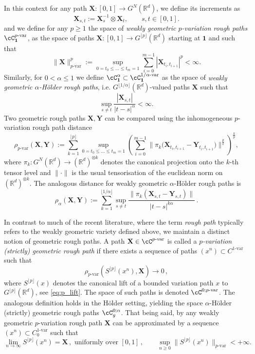\documentclass[12pt,a4paper]{article}
\numberwithin{equation}{section}
\def\bR{\mathbb{R}}\def\bS{\mathbb{S}}
\def\fX{\mathbf{X}}
\def\fY{\mathbf{Y}}\newcommand{\norm}[1]{\left\lVert#1\right\rVert}
\theoremstyle{plain}
\theoremstyle{definition}
\theoremstyle{remark}
\begin{document}
In this context for any path $\fX \colon [0,1] \to G^N(\bR^d)$, we define its increments as
\[
\fX_{s,t} := \fX_s^{-1} \otimes \fX_t, \qquad s,t \in [0,1].
\]
 and we define for any $p\geq1$ the space of \emph{weakly geometric $p$-variation rough paths} $\cC^{p\text{-var}}_{\mathbf{1}}$, as the space  of paths $\fX \colon [0,1] \to G^{\lfloor p \rfloor}(\bR^d)$ starting at ${\mathbf{1}}$ and such that
\[
\| \fX \|_{p\text{-var}}^p :=
    \sup_{0 = t_0 \leq \ldots \leq t_m = 1}
    \sum_{i=0}^{m-1} |\fX_{t_i,t_{i+1}}|^p < \infty.
\]
Similarly, for $0<\alpha \leq1$ we define $\cC^{\alpha}_{\mathbf{1}} \subset \cC^{1/\alpha\text{-var}}_{\mathbf{1}}$ as the space of \emph{weakly geometric $\alpha$-H\"older rough paths}, i.e. $G^{\lfloor 1/ \alpha\rfloor}(\bR^d)$-valued  paths $\fX$ such that
\[
\sup_{s \neq t} \frac{|\fX_{s,t}|}{|t-s|^{\alpha}} < \infty.
\]
Two geometric rough paths $\fX, \fY$ can be compared using the inhomogeneous $p$-variation rough path distance
\[
\rho_{p\text{-var}}(\fX, \fY) :=
\sum_{k=1}^{\lfloor p \rfloor}
    \sup_{0 = t_0 \leq \ldots \leq t_m = 1}
    \left(
        \sum_{i=0}^{m-1}
        \|
            \pi_k\big( \fX_{t_i,t_{i+1}} - \fY_{t_i,t_{i+1}} \big)
        \|^{\frac{p}{k}}
    \right)^{\frac{k}{p}},
\]
where $\pi_k \colon G^N(\bR^d) \to (\bR^d)^{\otimes k}$ denotes the canonical projection onto the $k$-th tensor level and $\|\cdot\|$ is the usual tensorisation of the euclidean norm on $(\bR^d)^{\otimes k}$. The analogous distance for weakly geometric $\alpha$-H\"older rough paths is
\[
\rho_{\alpha}(\fX, \fY) :=
\sum_{k=1}^{\lfloor 1/\alpha \rfloor}
 \sup_{s \neq t} \frac{\|\pi_k(\fX_{s,t} - \fY_{s,t})\|}{|t-s|^{k\alpha}}\,.
\]

In contrast to much of the recent literature, where the term \emph{rough path} typically refers to the weakly geometric variety defined above, we maintain a distinct notion of geometric rough paths. A path $\fX \in \cC^{p\text{-var}}$ is called a \emph{$p$-variation (strictly) geometric rough path} if there exists  a sequence of paths $(x^n)\subset  C^{1\text{-var}}$ such that  
\begin{equation}\label{eq_geom_approx}
 \rho_{p\text{-var}}(S^{\lfloor p \rfloor}(x^n), \fX)\to 0\,,
 \end{equation}
 where $S^{\lfloor p \rfloor}(x)$ denotes the canonical lift of a bounded variation path $x$ to $G^{\lfloor p \rfloor}(\bR^d)$, see \eqref{eq:p_lift}. The space of such paths is denoted $\cC^{0;p\text{-var}}$.  The analogous definition holds in the H\"older setting, yielding the space $\alpha$-H\"older (strictly) geometric rough paths $\cC^{0;\alpha}_g$. That being said, by \cite[Theorem 8.12]{frizbook} any weakly geometric $p$-variation rough path $\mathbf{X}$ can be approximated by a sequence $(x^n)\subset C^{1\text{-var}}_0$  such that
\begin{equation}\label{eq:approx}
\lim_{n\to \infty} S^{\lfloor p \rfloor}(x^n) = \mathbf{X}\,, \text{ uniformly over $[0,1]$}\,,
    \qquad \sup_{n\geq 0} \|S^{\lfloor p \rfloor}(x^n)\|_{p\text{-var}} < +\infty.
\end{equation}
\end{document}
